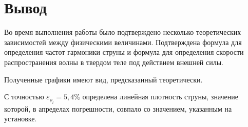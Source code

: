 \documentclass{article}
\begin{document}
\newpage
\section*{Вывод}

Во время выполнения работы было подтверждено несколько теоретических зависимостей между физическими величинами. Подтверждена формула для определения частот гармоники струны и формула для определения скорости распространения волны в твердом теле под действием внешней силы.

Полученные графики имеют вид, предсказанный теоретически. 

С точностью $ \varepsilon_{\rho_{l}} = 5,4\%$ определена линейная плотность струны, значение которой, в апределах погрешности, совпало со значением, указанным на установке.
	
\end{document}
